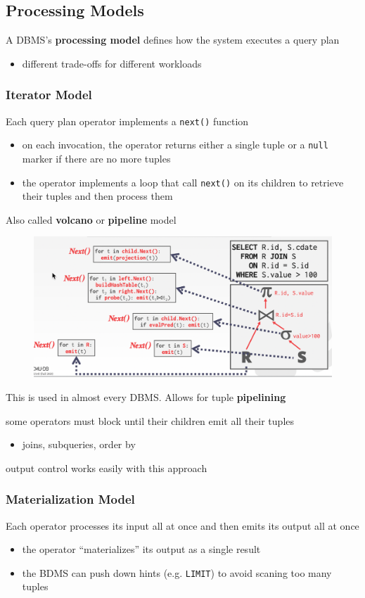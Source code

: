 \documentclass[11pt]{article}
\begin{document}
\subsection{Processing Models}
\label{sec:org0d0f24d}
A DBMS's \textbf{processing model} defines how the system executes a query plan
\begin{itemize}
\item different trade-offs for different workloads
\end{itemize}
\subsubsection{Iterator Model}
\label{sec:orgfea0200}
Each query plan operator implements a \texttt{next()} function
\begin{itemize}
\item on each invocation, the operator returns either a single tuple or a \texttt{null} marker if there are
no more tuples
\item the operator implements a loop that call \texttt{next()} on its children to retrieve their tuples and
then process them
\end{itemize}
Also called \textbf{volcano} or \textbf{pipeline} model

\begin{figure}[htbp]
\centering
\includegraphics[width=.8\textwidth]{../images/15445/24.png}
\label{}
\end{figure}

This is used in almost every DBMS. Allows for tuple \textbf{pipelining}

some operators must block until their children emit all their tuples
\begin{itemize}
\item joins, subqueries, order by
\end{itemize}

output control works easily with this approach
\subsubsection{Materialization Model}
\label{sec:org407820a}
Each operator processes its input all at once and then emits its output all at once
\begin{itemize}
\item the operator ``materializes'' its output as a single result
\item the BDMS can push down hints (e.g. \texttt{LIMIT}) to avoid scaning too many tuples
\end{itemize}
\end{document}
